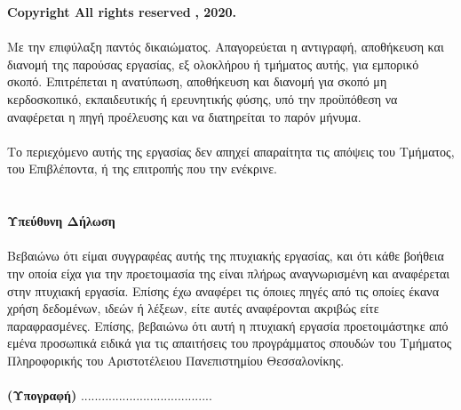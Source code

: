 \vspace{2.5cm}
{\bf \lt Copyright \textcopyright  All rights reserved} {\bf {}, 2020.}
\\
\vspace{0.5cm}
\\
{  Με την επιφύλαξη παντός δικαιώματος. Απαγορεύεται η αντιγραφή, αποθήκευση και διανομή της παρούσας εργασίας, εξ ολοκλήρου ή τμήματος αυτής, για εμπορικό σκοπό. Επιτρέπεται η ανατύπωση, αποθήκευση και διανομή για σκοπό μη κερδοσκοπικό, εκπαιδευτικής ή ερευνητικής φύσης, υπό την προϋπόθεση να αναφέρεται η πηγή προέλευσης και να διατηρείται το παρόν μήνυμα.}
\\
\vspace{0.5cm}
\\
{ Το περιεχόμενο αυτής της εργασίας δεν απηχεί απαραίτητα τις απόψεις του Τμήματος, του
Επιβλέποντα, ή της επιτροπής που την ενέκρινε.}
\\
\vspace{0.5cm}
\\
\\
{\bfseries Υπεύθυνη Δήλωση}
\\
\\
{ Βεβαιώνω ότι είμαι συγγραφέας αυτής της πτυχιακής εργασίας, και ότι κάθε βοήθεια την οποία είχα για την προετοιμασία της είναι πλήρως αναγνωρισμένη και αναφέρεται στην πτυχιακή εργασία. Επίσης έχω αναφέρει τις όποιες πηγές από τις οποίες έκανα χρήση δεδομένων, ιδεών ή λέξεων, είτε αυτές αναφέρονται ακριβώς είτε παραφρασμένες. Επίσης, βεβαιώνω ότι αυτή η πτυχιακή εργασία προετοιμάστηκε από εμένα προσωπικά ειδικά για τις απαιτήσεις του
προγράμματος σπουδών του Τμήματος Πληροφορικής του Αριστοτέλειου Πανεπιστημίου Θεσσαλονίκης.}
\\ \\
{\bfseries (Υπογραφή)}
......................................
\ \\\\
{ \bfseries {}}